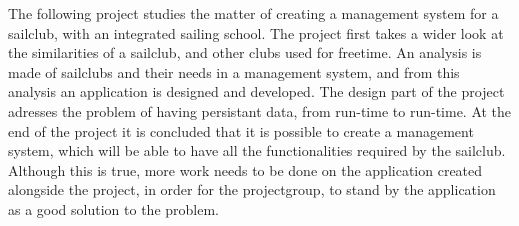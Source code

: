 
The following project studies the matter of creating a management system for a sailclub, with an integrated sailing school.
The project first takes a wider look at the similarities of a sailclub, and other clubs used for freetime.
An analysis is made of sailclubs and their needs in a management system, and from this analysis an application is designed and developed. 
The design part of the project adresses the problem of having persistant data, from run-time to run-time. 
At the end of the project it is concluded that it is possible to create a management system, which will be able to have all the functionalities required by the sailclub. 
Although this is true, more work needs to be done on the application created alongside the project, in order for the projectgroup, to stand by the application as a good solution to the problem.